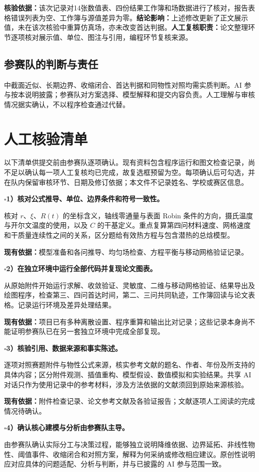 \documentclass[UTF8,a4paper,12pt,fontset=windows]{ctexart}
\newcommand{\field}[1]{\textbf{#1：}}
\newcommand{\checkitem}[1]{\par\noindent$\square$\quad\textbf{#1}\par}
\begin{document}
\field{核验依据}该次记录对14张数值表、四份结果工作簿和场数据进行了核对，报告表格错误列表为空、工作簿与源值差异为零。\field{结论影响}上述修改更新了正文展示值，未在该次核验中重算仿真场，亦未改变首达判据。\field{人工复核职责}论文整理环节逐项核对展示值、单位、图注与引用，编程环节复核来源。

\subsection{参赛队的判断与责任}
中截面近似、长期边界、收缩闭合、首达判据和同物性对照均需实质判断。AI 参与按本说明披露；参赛队对方案选择、模型解释和提交内容负责。人工理解与审核情况据实确认，不以程序检查通过代替。

\newpage
\section{人工核验清单}
以下清单供提交前由参赛队逐项确认。现有资料包含程序运行和图文检查记录，尚不足以确认每一项人工复核均已完成，故复选框预留为空。每项确认后可勾选，并在队内保留审核环节、日期及修订依据；本文件不记录姓名、学校或赛区信息。

\checkitem{1）核对公式推导、单位、边界条件和符号一致性。}
核对 $r$、$\xi$、$R(t)$ 的坐标含义，轴线零通量与表面 Robin 条件的方向，摄氏温度与开尔文温度的使用，以及 $C$ 的干基定义。重点复算第四问材料速度、网格速度和干质量连续性之间的关系，区分题给有效热方程与包含潜热的总焓模型。

\textbf{现有依据：}模型准备和各问推导、均匀场检查、方程平衡与移动网格验证记录。

\checkitem{2）在独立环境中运行全部代码并复现论文图表。}
从原始附件开始运行求解、收敛验证、灵敏度、二维与移动网格验证、结果导出及绘图程序，检查第三、四问首达时间，第二、三问共同轨迹，工作簿回读与论文表格。记录运行环境及差异处理结果。

\textbf{现有依据：}项目已有多种离散设置、程序重算和输出比对记录；这些记录本身尚不能证明参赛队已在另一套独立环境中完成全部复现。

\checkitem{3）核验引用、数据来源和事实陈述。}
逐项对照赛题附件与物性公式来源，核实参考文献的题名、作者、年份及所支持的具体内容；区分附件观测、插值重构、模型假设、数值模拟和实验结果。共享 AI 对话只作为使用记录中的参考材料，涉及方法依据的文献须回到原始来源核验。

\textbf{现有依据：}附件检查记录、论文参考文献及各验证报告；文献逐项人工阅读的完成情况待确认。

\checkitem{4）确认核心建模与分析由参赛队主导。}
由参赛队确认实际分工与决策过程，能够独立说明降维依据、边界延拓、非线性物性、阈值事件、收缩闭合和对照方案，解释为何采纳或修改相应建议。原创性说明应对应具体的问题适配、分析与判断，并与已披露的 AI 参与范围一致。
\end{document}
